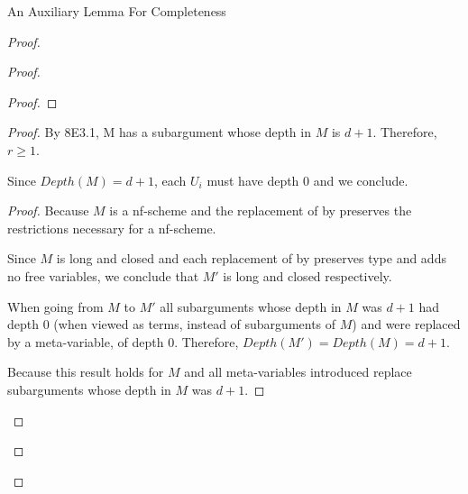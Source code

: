 \begin{frame}[allowframebreaks]{An Auxiliary Lemma For Completeness}
\begin{proof}
\begin{proof}
\begin{proof}
\medskip


\framebreak

\end{proof}

\begin{proof}
By 8E3.1, M has a subargument whose depth in $M$ is $d+1$. Therefore, $r \geq 1$.

\medskip 

Since $Depth(M) = d+1$, each $U_i$ must have depth 0 and we conclude. 

\medskip


\medskip 

\begin{proof}
Because $M$ is a nf-scheme and the replacement of  by  preserves the restrictions necessary for a nf-scheme. 
\medskip

Since $M$ is long and closed and each replacement
of  by  preserves type and adds no free variables, we conclude that $M'$ is long and closed respectively. 

\medskip

When going from $M$ to $M'$ all subarguments whose depth in $M$ was $d+1$ had depth 0 (when viewed as terms, instead of subarguments of $M$) and were replaced by a meta-variable, of depth 0. Therefore, $Depth(M') = Depth(M) = d+1$.

\medskip

Because this result holds for $M$ and all meta-variables introduced replace subarguments whose depth in $M$ was $d+1$.

\medskip 


\end{proof}
\end{proof}
\end{proof}
\end{proof}
\end{frame}
